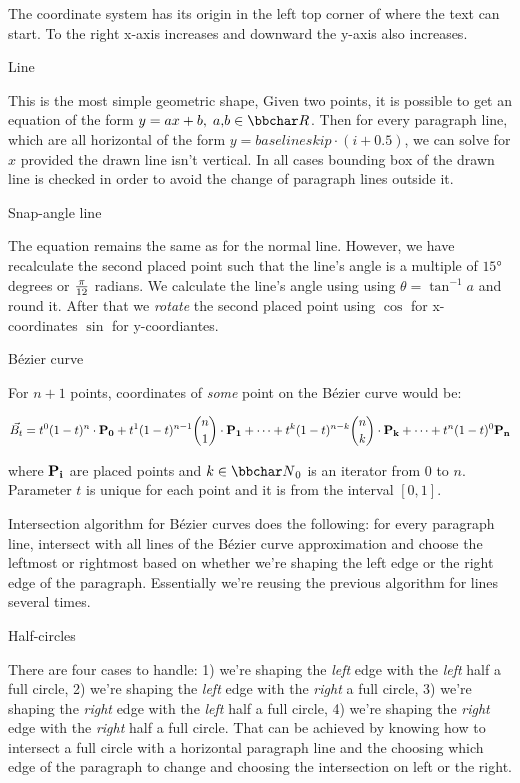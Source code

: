 The coordinate system has its origin in the left top corner of where the text can start.
To the right x-axis increases and downward the y-axis also increases.

\curvetitle Line

This is the most simple geometric shape, Given two points, it is possible to get an equation
of the form $y = ax + b,\;a,\!b \in {\bbchar R}$. Then for every paragraph line, which are all
horizontal of the form $y = baselineskip \cdot (i + 0.5)$, we can solve for $x$
provided the drawn line isn't vertical. In all cases bounding box of the drawn line is checked
in order to avoid the change of paragraph lines outside it.

\curvetitle Snap-angle line

The equation remains the same as for the normal line. However, we have recalculate the second placed
point such that the line's angle is a multiple of $\ang{15}$ degrees or $\pi \over 12$ radians.
We calculate the line's angle using using $\theta = \tan^{-1}{a}$ and round it.
After that we {\it rotate} the second placed point using $\cos$ for x-coordinates $\sin$
for y-coordiantes.

\curvetitle Bézier curve

For $n+1$ points, coordinates of {\it some} point on the Bézier curve would be:

$$
\vec{B_t} =
t^0 (1-t)^n \cdot {\bf P_0} +
t^1 (1-t)^{n-1} {n \choose 1} \cdot {\bf P_1} +
\cdots +
t^k (1-t)^{n-k} {n \choose k} \cdot {\bf P_k} +
\cdots +
t^n (1-t)^0 {\bf P_n}
$$

where $\bf P_i$ are placed points and $k \in {\bbchar N}_0$ is an iterator from $0$ to $n$.
Parameter $t$ is unique for each point and it is from the interval $[0,1]$.

Intersection algorithm for Bézier curves does the following: for every paragraph
line, intersect with all lines of the Bézier curve approximation and choose the
leftmost or rightmost based on whether we're shaping the left edge or the right edge
of the paragraph. Essentially we're reusing the previous algorithm for lines several
times.

\curvetitle Half-circles

There are four cases to handle:
1) we're shaping the {\it left} edge with the {\it left} half a full circle,
2) we're shaping the {\it left} edge with the {\it right} a full circle,
3) we're shaping the {\it right} edge with the {\it left} half a full circle,
4) we're shaping the {\it right} edge with the {\it right} half a full circle.
That can be achieved by knowing how to intersect a full circle with a horizontal
paragraph line and the choosing which edge of the paragraph to change and choosing
the intersection on left or the right.

